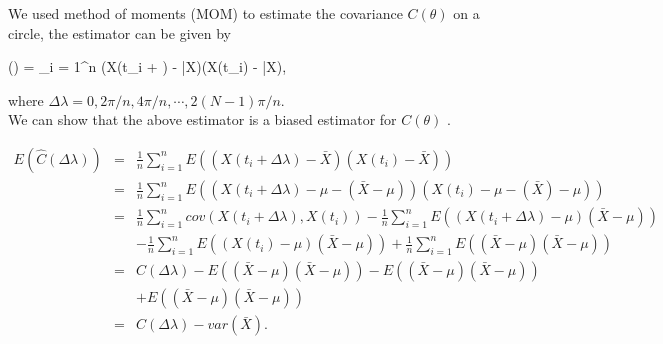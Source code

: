 We used method of moments (MOM) to estimate the covariance $C(\theta)$ on a circle, the estimator can be given by

\beq \label{covarince_estimator}
(\Delta \lambda) = \sum_{i = 1}^n (X(t_i + \Delta \lambda) - \bar{X})(X(t_i) - \bar{X}), 
\eeq

where $\Delta \lambda = 0, 2\pi/n, 4\pi/n, \cdots, 2(N-1)\pi/n$.\\

We can show that the above estimator is a biased estimator for $C(\theta)$ .

\begin{eqnarray}
	\nonumber
	E(\hat{C}(\Delta \lambda)) &=& \frac{1}{n}\sum_{i = 1}^n E((X(t_i + \Delta \lambda) - \bar{X})(X(t_i) - \bar{X})) \\ \nonumber
	&=& \frac{1}{n}\sum_{i = 1}^n E((X(t_i + \Delta \lambda) - \mu - (\bar{X} - \mu))(X(t_i) -\mu - (\bar{X}) - \mu)) \\ \nonumber
	&=& \frac{1}{n}\sum_{i=1}^n cov(X(t_i+\Delta \lambda), X(t_i)) - \frac{1}{n}\sum_{i = 1}^n E((X(t_i + \Delta \lambda) - \mu)(\bar{X} - \mu)) \\ \nonumber
	& & -\frac{1}{n}\sum_{i = 1}^n E((X(t_i) - \mu)(\bar{X} - \mu)) + \frac{1}{n}\sum_{i = 1}^n E((\bar{X} - \mu)(\bar{X} - \mu)) \\ \nonumber
	&=& C(\Delta \lambda) -E((\bar{X} - \mu)(\bar{X} - \mu)) - E((\bar{X} - \mu)(\bar{X} - \mu)) \\ \nonumber 
	& & + E((\bar{X} - \mu)(\bar{X} - \mu)) \\ \nonumber
	&=& C(\Delta \lambda) - var(\bar{X}).
\end{eqnarray}


